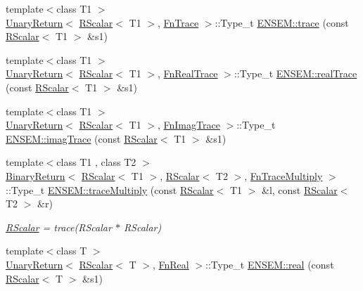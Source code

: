 \begin{DoxyCompactItemize}
\item 
{\footnotesize template$<$class T1 $>$ }\\\mbox{\hyperlink{structENSEM_1_1UnaryReturn}{Unary\+Return}}$<$ \mbox{\hyperlink{classENSEM_1_1RScalar}{R\+Scalar}}$<$ T1 $>$, \mbox{\hyperlink{structENSEM_1_1FnTrace}{Fn\+Trace}} $>$\+::Type\+\_\+t \mbox{\hyperlink{group__rscalar_ga0d92a68fbffd9e97af74d7c35b92536b}{E\+N\+S\+E\+M\+::trace}} (const \mbox{\hyperlink{classENSEM_1_1RScalar}{R\+Scalar}}$<$ T1 $>$ \&s1)
\item 
{\footnotesize template$<$class T1 $>$ }\\\mbox{\hyperlink{structENSEM_1_1UnaryReturn}{Unary\+Return}}$<$ \mbox{\hyperlink{classENSEM_1_1RScalar}{R\+Scalar}}$<$ T1 $>$, \mbox{\hyperlink{structENSEM_1_1FnRealTrace}{Fn\+Real\+Trace}} $>$\+::Type\+\_\+t \mbox{\hyperlink{group__rscalar_gad8c5ca0fef5f4bc08eb384e14b4017fa}{E\+N\+S\+E\+M\+::real\+Trace}} (const \mbox{\hyperlink{classENSEM_1_1RScalar}{R\+Scalar}}$<$ T1 $>$ \&s1)
\item 
{\footnotesize template$<$class T1 $>$ }\\\mbox{\hyperlink{structENSEM_1_1UnaryReturn}{Unary\+Return}}$<$ \mbox{\hyperlink{classENSEM_1_1RScalar}{R\+Scalar}}$<$ T1 $>$, \mbox{\hyperlink{structENSEM_1_1FnImagTrace}{Fn\+Imag\+Trace}} $>$\+::Type\+\_\+t \mbox{\hyperlink{group__rscalar_ga93f83573ea0cfc6dca10a8bf879ab0a7}{E\+N\+S\+E\+M\+::imag\+Trace}} (const \mbox{\hyperlink{classENSEM_1_1RScalar}{R\+Scalar}}$<$ T1 $>$ \&s1)
\item 
{\footnotesize template$<$class T1 , class T2 $>$ }\\\mbox{\hyperlink{structENSEM_1_1BinaryReturn}{Binary\+Return}}$<$ \mbox{\hyperlink{classENSEM_1_1RScalar}{R\+Scalar}}$<$ T1 $>$, \mbox{\hyperlink{classENSEM_1_1RScalar}{R\+Scalar}}$<$ T2 $>$, \mbox{\hyperlink{structENSEM_1_1FnTraceMultiply}{Fn\+Trace\+Multiply}} $>$\+::Type\+\_\+t \mbox{\hyperlink{group__rscalar_ga04705f685567963d28806500dd6dde85}{E\+N\+S\+E\+M\+::trace\+Multiply}} (const \mbox{\hyperlink{classENSEM_1_1RScalar}{R\+Scalar}}$<$ T1 $>$ \&l, const \mbox{\hyperlink{classENSEM_1_1RScalar}{R\+Scalar}}$<$ T2 $>$ \&r)
\begin{DoxyCompactList}\small\item\em \mbox{\hyperlink{classENSEM_1_1RScalar}{R\+Scalar}} = trace(\+R\+Scalar $\ast$ R\+Scalar) \end{DoxyCompactList}\item 
{\footnotesize template$<$class T $>$ }\\\mbox{\hyperlink{structENSEM_1_1UnaryReturn}{Unary\+Return}}$<$ \mbox{\hyperlink{classENSEM_1_1RScalar}{R\+Scalar}}$<$ T $>$, \mbox{\hyperlink{structENSEM_1_1FnReal}{Fn\+Real}} $>$\+::Type\+\_\+t \mbox{\hyperlink{group__rscalar_ga50a51e948d621f811040859a236b48f9}{E\+N\+S\+E\+M\+::real}} (const \mbox{\hyperlink{classENSEM_1_1RScalar}{R\+Scalar}}$<$ T $>$ \&s1)

\end{DoxyCompactItemize}
